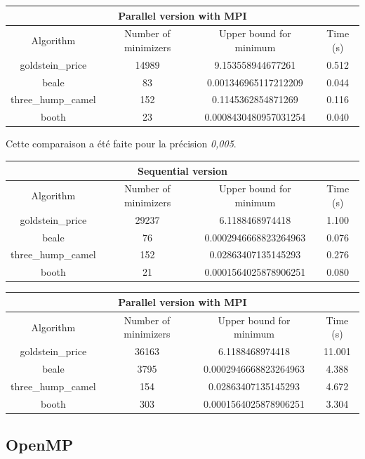 \documentclass[a4paper,10pt]{article}
\begin{document}
\begin{tabular}{|c|c|c|c|}
\hline
\multicolumn{4}{|c|}{Parallel version with MPI}\\
\hline
Algorithm & Number of minimizers & Upper bound for minimum & Time (s) \\
\hline
goldstein\_price & 14989 & 9.153558944677261 & 0.512\\
\hline
beale & 83 & 0.001346965117212209 & 0.044\\
\hline
three\_hump\_camel & 152 & 0.1145362854871269 & 0.116\\
\hline
booth & 23 & 0.0008430480957031254 & 0.040\\
\hline
\end{tabular}

Cette comparaison a été faite pour la précision \emph{0,005}.

\begin{tabular}{|c|c|c|c|}
\hline
\multicolumn{4}{|c|}{Sequential version}\\
\hline
Algorithm & Number of minimizers & Upper bound for minimum & Time (s) \\
\hline
goldstein\_price & 29237 & 6.1188468974418 & 1.100\\
\hline
beale & 76 & 0.0002946668823264963 & 0.076\\
\hline
three\_hump\_camel & 152 & 0.02863407135145293 & 0.276\\
\hline
booth & 21 & 0.0001564025878906251 & 0.080\\
\hline
\end{tabular}

\begin{tabular}{|c|c|c|c|}
\hline
\multicolumn{4}{|c|}{Parallel version with MPI}\\
\hline
Algorithm & Number of minimizers & Upper bound for minimum & Time (s) \\
\hline
goldstein\_price & 36163 & 6.1188468974418 & 11.001\\
\hline
beale & 3795 & 0.0002946668823264963 & 4.388\\
\hline
three\_hump\_camel & 154 & 0.02863407135145293 & 4.672\\
\hline
booth & 303 & 0.0001564025878906251 & 3.304\\
\hline
\end{tabular}

\subsection{OpenMP}
\end{document}
